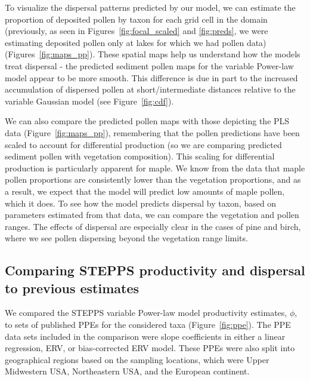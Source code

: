 \documentclass[12pt]{article}
\begin{document}


To visualize the dispersal patterns predicted by our model, we can
estimate the proportion of deposited pollen by taxon for each grid
cell in the domain (previously, as seen in
Figures~\ref{fig:focal_scaled} and \ref{fig:preds}, we were estimating
deposited pollen only at lakes for which we had pollen data)
(Figures~\ref{fig:maps_pp}). These spatial maps help us understand how
the models treat dispersal - the predicted sediment pollen maps for
the variable Power-law model appear to be more smooth. This difference
is due in part to the increased accumulation of dispersed pollen at
short/intermediate distances relative to the variable Gaussian model
(see Figure~\ref{fig:cdf}).

We can also compare the predicted pollen maps with those depicting the
PLS data (Figure~\ref{fig:maps_pp}), remembering that the pollen
predictions have been scaled to account for differential production
(so we are comparing predicted sediment pollen with vegetation
composition). This scaling for differential production is particularly
apparent for maple. We know from the data that maple pollen
proportions are consistently lower than the vegetation proportions,
and as a result, we expect that the model will predict low amounts of
maple pollen, which it does. To see how the model predicts dispersal
by taxon, based on parameters estimated from that data, we can compare
the vegetation and pollen ranges. The effects of dispersal are
especially clear in the cases of pine and birch, where we see pollen
dispersing beyond the vegetation range limits.

\subsection{Comparing STEPPS productivity and dispersal to previous
  estimates}

We compared the STEPPS variable Power-law model productivity
estimates, $\phi$, to sets of published PPEs for the considered taxa
(Figure~\ref{fig:ppe}). The PPE data sets included in the comparison
were slope coefficients in either a linear regression, ERV, or
bias-corrected ERV model. These PPEs were also split into geographical
regions based on the sampling locations, which were Upper Midwestern
USA, Northeastern USA, and the European
continent. %
\end{document}
